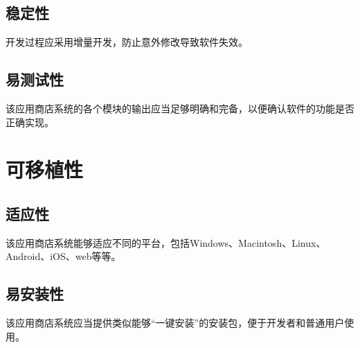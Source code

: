\subsection{稳定性}
开发过程应采用增量开发，防止意外修改导致软件失效。
\subsection{易测试性}
该应用商店系统的各个模块的输出应当足够明确和完备，以便确认软件的功能是否正确实现。

\section{可移植性}
\subsection{适应性}
该应用商店系统能够适应不同的平台，包括Windows、Macintosh、Linux、Android、iOS、web等等。
\subsection{易安装性}
该应用商店系统应当提供类似能够“一键安装”的安装包，便于开发者和普通用户使用。


